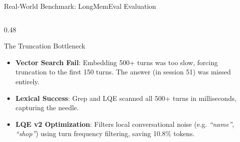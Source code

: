 \documentclass[aspectratio=169]{beamer}
\begin{document}
\begin{frame}{Real-World Benchmark: LongMemEval Evaluation}
    \begin{columns}[T]
        \begin{column}{0.48\textwidth}
            \begin{block}{The Truncation Bottleneck}
                \small
                \begin{itemize}
                    \item \textbf{Vector Search Fail}: Embedding 500+ turns was too slow, forcing truncation to the first 150 turns. The answer (in session 51) was missed entirely.
                    \item \textbf{Lexical Success}: Grep and LQE scanned all 500+ turns in milliseconds, capturing the needle.
                    \item \textbf{LQE v2 Optimization}: Filters local conversational noise (e.g. \textit{``name''}, \textit{``shop''}) using turn frequency filtering, saving 10.8\% tokens.
                \end{itemize}
            \end{block}
        \end{column}
    \end{columns}
\end{frame}
\end{document}
